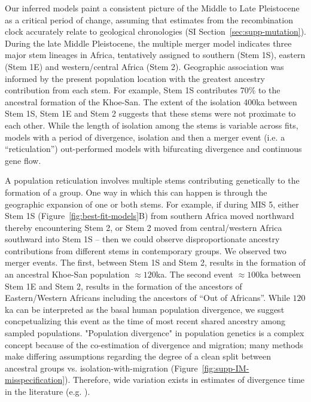 \documentclass[]{article}
\begin{document}
Our inferred models paint a consistent picture of the Middle to Late
Pleistocene as a critical period of change, assuming that estimates from the
recombination clock accurately relate to geological chronologies (SI
Section~\ref{sec:supp-mutation}). During the late Middle Pleistocene, the
multiple merger model indicates three major stem lineages in Africa,
tentatively assigned to southern (Stem 1S), eastern (Stem 1E) and
western/central Africa (Stem 2). Geographic association was informed by the
present population location with the greatest ancestry contribution from each
stem. For example, Stem 1S contributes 70\% to the ancestral formation of the
Khoe-San. The extent of the isolation \>400ka between Stem 1S, Stem 1E and Stem
2 suggests that these stems were not proximate to each other. While the length
of isolation among the stems is variable across fits, models with a period of
divergence, isolation and then a merger event (i.e. a ``reticulation'')
out-performed models with bifurcating divergence and continuous gene flow. 

A population reticulation involves multiple stems contributing genetically to
the formation of a group. One way in which this can happen is through the
geographic expansion of one or both stems. For example, if during MIS 5, either
Stem 1S (Figure~\ref{fig:best-fit-models}B) from southern Africa moved
northward thereby encountering Stem 2, or Stem 2 moved from central/western
Africa southward into Stem 1S -- then we could observe disproportionate
ancestry contributions from different stems in contemporary groups. We observed
two merger events. The first, between Stem 1S and Stem 2, results in the
formation of an ancestral Khoe-San population $\approx120$ka. The second event
$\approx100$ka between Stem 1E and Stem 2, results in the formation of the
ancestors of Eastern/Western Africans including the ancestors of ``Out of
Africans''. While $120$ka can be interpreted as the basal human population divergence,
we suggest concpetualizing this event as the time of most recent shared ancestry among sampled populations.
"Population divergence" in population genetics is a complex concept because of the co-estimation of divergence and migration;
many methods make differing assumptions regarding the degree of a clean split between ancestral groups vs. isolation-with-migration 
(Figure~\ref{fig:supp-IM-misspecification}). Therefore, wide variation exists in estimates of 
divergence time in the literature (e.g. \citep{Pagani2015-pz }). 
\end{document}
